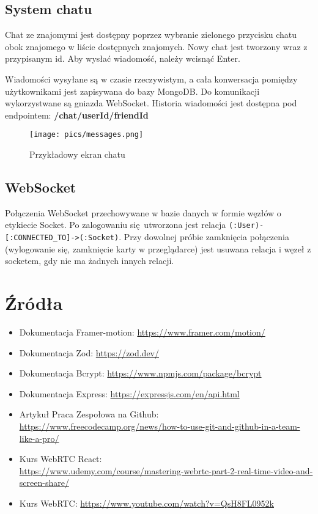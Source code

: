 \documentclass{article}
\begin{document}
\subsection{System chatu}

Chat ze znajomymi jest dostępny poprzez wybranie zielonego przycisku chatu obok znajomego w liście dostępnych znajomych. Nowy chat jest tworzony wraz z przypisanym id. Aby wysłać wiadomość, należy wcisnąć Enter.

Wiadomości wysyłane są w czasie rzeczywistym, a cała konwersacja pomiędzy użytkownikami jest zapisywana do bazy MongoDB. Do komunikacji wykorzystwane są gniazda WebSocket. Historia wiadomości jest dostępna pod endpointem: \textbf{/chat/userId/friendId}

\begin{figure}[h]
    \centering
    \texttt{[image: pics/messages.png]}
    \caption*{Przykładowy ekran chatu}
\end{figure}

\subsection{WebSocket}
Połączenia WebSocket przechowywane w bazie danych w formie węzłów o etykiecie Socket.
Po zalogowaniu się utworzona jest relacja \verb|(:User)-[:CONNECTED_TO]->(:Socket)|.
Przy dowolnej próbie zamknięcia połączenia (wylogowanie się, zamknięcie karty w przeglądarce)
jest usuwana relacja i węzeł z socketem, gdy nie ma żadnych innych relacji.

\section{Źródła}
\begin{itemize}
    \item Dokumentacja Framer-motion: \url{https://www.framer.com/motion/}
    \item Dokumentacja Zod: \url{https://zod.dev/}
    \item Dokumentacja Bcrypt: \url{https://www.npmjs.com/package/bcrypt}
    \item Dokumentacja Express: \url{https://expressjs.com/en/api.html}
    \item Artykuł Praca Zespołowa na Github: \\
    \url{https://www.freecodecamp.org/news/how-to-use-git-and-github-in-a-team-like-a-pro/}
    \item Kurs WebRTC React: \\
    \url{https://www.udemy.com/course/mastering-webrtc-part-2-real-time-video-and-screen-share/}
    \item Kurs WebRTC: \url{https://www.youtube.com/watch?v=QsH8FL0952k}
\end{itemize}
\end{document}
